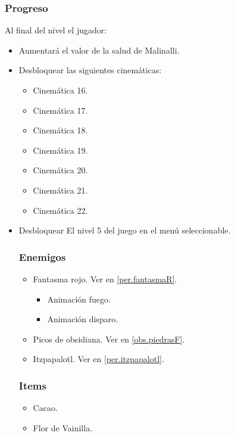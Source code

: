 \documentclass[11pt,letterpaper]{article}
\begin{document}
        \subsubsection{Progreso}
Al final del nivel el jugador:
\begin{itemize}
        \item Aumentará el valor de la salud de Malinalli.
        \item Desbloquear las siguientes cinemáticas:
		\begin{itemize}
			\item Cinemática 16.
			\item Cinemática 17.
			\item Cinemática 18.
			\item Cinemática 19.
			\item Cinemática 20.
			\item Cinemática 21.
			\item Cinemática 22.
		\end{itemize}
        \item Desbloquear El nivel 5 del juego en el menú seleccionable.
        \subsubsection{Enemigos}
                \begin{itemize}
                        \item Fantasma rojo. Ver en \ref{per.fantasmaR}. 
            \begin{itemize}
				\item Animación fuego.
				\item Animación disparo.
			\end{itemize}
                        \item Picos de obsidiana. Ver en \ref{obs.piedrasF}.
                        \item Itzpapalotl. Ver en \ref{per.itzpapalotl}.
                \end{itemize}
        \subsubsection{Items}
                \begin{itemize}
                        \item   Cacao.
                        \item Flor de Vainilla.
                \end{itemize}

\end{itemize}
\end{document}
